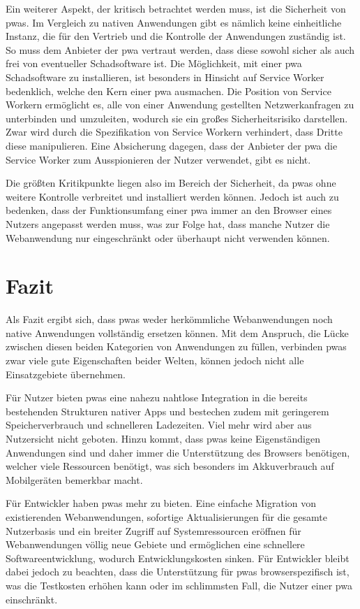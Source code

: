 \documentclass[12pt, parskip=half]{scrartcl}       %
\begin{document}
Ein weiterer Aspekt, der kritisch betrachtet werden muss, ist die Sicherheit von \acp{pwa}.
Im Vergleich zu nativen Anwendungen gibt es nämlich keine einheitliche Instanz, die für den Vertrieb und die Kontrolle der Anwendungen zuständig ist.
So muss dem Anbieter der \ac{pwa} vertraut werden, dass diese sowohl sicher als auch frei von eventueller Schadsoftware ist.
Die Möglichkeit, mit einer \ac{pwa} Schadsoftware zu installieren, ist besonders in Hinsicht auf Service Worker bedenklich, welche den Kern einer \ac{pwa} ausmachen.
Die Position von Service Workern ermöglicht es, alle von einer Anwendung gestellten Netzwerkanfragen zu unterbinden und umzuleiten, wodurch sie ein großes Sicherheitsrisiko darstellen.
Zwar wird durch die Spezifikation von Service Workern verhindert, dass Dritte diese manipulieren.
Eine Absicherung dagegen, dass der Anbieter der \ac{pwa} die Service Worker zum Ausspionieren der Nutzer verwendet, gibt es nicht.

Die größten Kritikpunkte liegen also im Bereich der Sicherheit, da \acp{pwa} ohne weitere Kontrolle verbreitet und installiert werden können.
Jedoch ist auch zu bedenken, dass der Funktionsumfang einer \ac{pwa} immer an den Browser eines Nutzers angepasst werden muss, was zur Folge hat, dass manche Nutzer die Webanwendung nur eingeschränkt oder überhaupt nicht verwenden können.

\newpage

\section{Fazit}
\label{sec:fazit}

Als Fazit ergibt sich, dass \acp{pwa} weder herkömmliche Webanwendungen noch native Anwendungen vollständig ersetzen können.
Mit dem Anspruch, die Lücke zwischen diesen beiden Kategorien von Anwendungen zu füllen, verbinden \acp{pwa} zwar viele gute Eigenschaften beider Welten, können jedoch nicht alle Einsatzgebiete übernehmen.

Für Nutzer bieten \acp{pwa} eine nahezu nahtlose Integration in die bereits bestehenden Strukturen nativer Apps und bestechen zudem mit geringerem Speicherverbrauch und schnelleren Ladezeiten.
Viel mehr wird aber aus Nutzersicht nicht geboten.
Hinzu kommt, dass \acp{pwa} keine Eigenständigen Anwendungen sind und daher immer die Unterstützung des Browsers benötigen, welcher viele Ressourcen benötigt, was sich besonders im Akkuverbrauch auf Mobilgeräten bemerkbar macht.

Für Entwickler haben \acp{pwa} mehr zu bieten.
Eine einfache Migration von existierenden Webanwendungen, sofortige Aktualisierungen für die gesamte Nutzerbasis und ein breiter Zugriff auf Systemressourcen eröffnen für Webanwendungen völlig neue Gebiete und ermöglichen eine schnellere Softwareentwicklung, wodurch Entwicklungskosten sinken.
Für Entwickler bleibt dabei jedoch zu beachten, dass die Unterstützung für \acp{pwa} browserspezifisch ist, was die Testkosten erhöhen kann oder im schlimmsten Fall, die Nutzer einer \ac{pwa} einschränkt.
\end{document}

